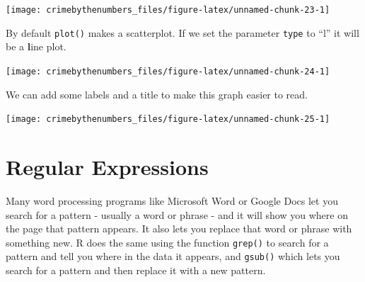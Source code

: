 \documentclass[
]{krantz}
\makeatletter
\newenvironment{Shaded}{\begin{snugshade}}{\end{snugshade}}
\newcommand{\AttributeTok}[1]{\textcolor[rgb]{0.61,0.61,0.61}{#1}}
\newcommand{\FunctionTok}[1]{\textcolor[rgb]{0,0,0}{#1}}
\newcommand{\NormalTok}[1]{#1}
\newcommand{\SpecialCharTok}[1]{\textcolor[rgb]{0,0,0}{#1}}
\newcommand{\StringTok}[1]{\textcolor[rgb]{0.5,0.5,0.5}{#1}}
\newenvironment{kframe}{%
\medskip{}
\setlength{\fboxsep}{.8em}
 \def\at@end@of@kframe{}%
 \ifinner\ifhmode%
  \def\at@end@of@kframe{\end{minipage}}%
  \begin{minipage}{\columnwidth}%
 \fi\fi%
 \def\FrameCommand##1{\hskip\@totalleftmargin \hskip-\fboxsep
 \colorbox{shadecolor}{##1}\hskip-\fboxsep
     \hskip-\linewidth \hskip-\@totalleftmargin \hskip\columnwidth}%
 \MakeFramed {\advance\hsize-\width
   \@totalleftmargin\z@ \linewidth\hsize
   \@setminipage}}%
 {\par\unskip\endMakeFramed%
 \at@end@of@kframe}
\renewenvironment{Shaded}{\begin{kframe}}{\end{kframe}}
\makeatother
\begin{document}
\begin{center}\texttt{[image: crimebythenumbers\_files/figure-latex/unnamed-chunk-23-1]} \end{center}

By default \texttt{plot()} makes a scatterplot. If we set the parameter \texttt{type} to ``l'' it will be a \textbf{l}ine plot.

\begin{Shaded}
\end{Shaded}

\begin{center}\texttt{[image: crimebythenumbers\_files/figure-latex/unnamed-chunk-24-1]} \end{center}

We can add some labels and a title to make this graph easier to read.

\begin{Shaded}
\end{Shaded}

\begin{center}\texttt{[image: crimebythenumbers\_files/figure-latex/unnamed-chunk-25-1]} \end{center}

\hypertarget{regular-expressions}{%
\chapter{Regular Expressions}\label{regular-expressions}}

Many word processing programs like Microsoft Word or Google Docs let you search for a pattern - usually a word or phrase - and it will show you where on the page that pattern appears. It also lets you replace that word or phrase with something new. R does the same using the function \texttt{grep()} to search for a pattern and tell you where in the data it appears, and \texttt{gsub()} which lets you search for a pattern and then replace it with a new pattern.
\end{document}
